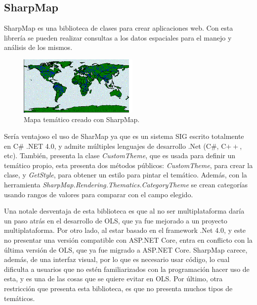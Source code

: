 \subsection{SharpMap}
SharpMap \cite{sharpmap} es una biblioteca de clases para crear aplicaciones web. Con esta librer\'ia se pueden realizar consultas a los datos espaciales para el manejo y an\'alisis de los mismos.

\begin{figure}
\vspace{-20pt}
\begin{center}
\includegraphics[width=0.52\textwidth]{images/sharpmap.png} 
\end{center} \vspace{-20pt} \caption{Mapa tem\'atico creado con SharpMap.}  \label{sharpmap} \vspace{-10pt} 
\end{figure}

Ser\'ia ventajoso el uso de SharMap ya que es un sistema SIG escrito totalmente en C\# .NET 4.0, y admite m\'ultiples lenguajes de desarrollo .Net (C\#, C$++$, etc). Tambi\'en, presenta la clase \textit{CustomTheme}, que es usada para definir un tem\'atico propio, esta presenta dos m\'etodos p\'ublicos: \textit{CustomTheme}, para crear la clase, y \textit{GetStyle}, para obtener un estilo para pintar el tem\'atico. Adem\'as, con la herramienta \textit{SharpMap.Rendering.Thematics.CategoryTheme} se crean categor\'ias usando rangos de valores para comparar con el campo elegido. \cite{sharpmap}

Una notale desventaja de esta biblioteca es que al no ser multiplataforma dar\'ia un paso atr\'as en el desarrollo de OLS, que ya
fue mejorado a un proyecto multiplataforma. Por otro lado, al estar basado en el framework .Net 4.0, y este no presentar una versi\'on compatible con ASP.NET Core, entra en conflicto con la \'ultima versi\'on de OLS, que ya fue migrado a ASP.NET Core. SharpMap carece, adem\'as, de una interfaz visual, por lo que es necesario usar c\'odigo, lo cual dificulta a usuarios que no est\'en familiarizados con la programaci\'on hacer uso de esta, y es una de las cosas que se quiere evitar en OLS. Por \'ultimo, otra restricci\'on que presenta esta biblioteca, es que no presenta muchos tipos de tem\'aticos.


